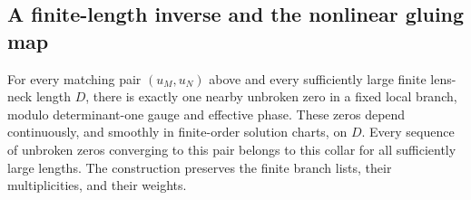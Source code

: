 \subsection{A finite-length inverse and the nonlinear gluing map}

\begin{proposition}
\label{prop:gluing:collar}
For every matching pair $(u_M,u_N)$ above and every sufficiently
large finite lens-neck length $D$, there is exactly one nearby
unbroken zero in a fixed local branch, modulo determinant-one gauge
and effective phase.  These zeros depend continuously, and smoothly
in finite-order solution charts, on $D$.  Every sequence of unbroken
zeros converging to this pair belongs to this collar for all
sufficiently large lengths.  The construction preserves the finite
branch lists, their multiplicities, and their weights.
\end{proposition}

